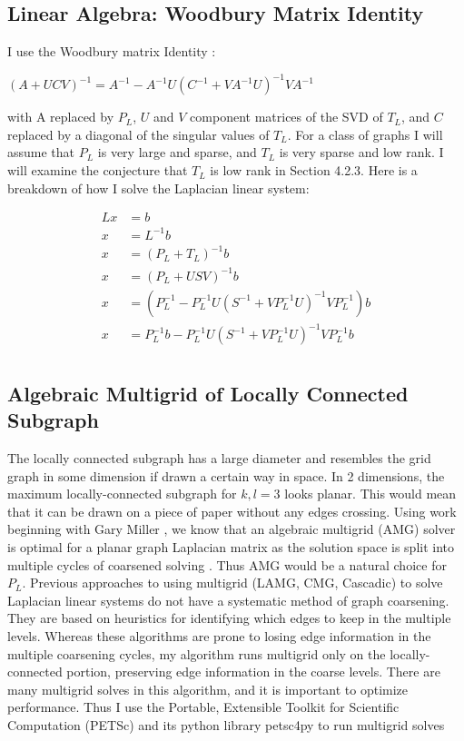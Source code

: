 \documentclass{article}
\begin{document}
\subsection{Linear Algebra: Woodbury Matrix Identity}
I use the Woodbury matrix Identity \cite{Woodbury:1950}:\\
\begin{spacing}{1}

\begin{center}
$(A+UCV)^{-1} = A^{-1} - A^{-1}U(C^{-1}+VA^{-1}U)^{-1}VA^{-1}$\\
\end{center}
\end{spacing}
with A replaced by $P_L$, $U$ and $V$ component matrices of the SVD of $T_L$, and $C$ replaced by a diagonal of the singular values of $T_L$. For a class of graphs I will assume that $P_L$ is very large and sparse, and $T_L$ is very sparse and low rank. I will examine the conjecture that $T_L$ is
low rank in Section 4.2.3. Here is a breakdown of how I solve the Laplacian linear system:

\begin{spacing}{1}
\begin{align*}
Lx & = b\\
x & = L^{-1}b\\
x & = (P_L+T_L)^{-1}b\\
x & = (P_L+USV)^{-1}b\\
x & = (P_L^{-1}-P_L^{-1}U(S^{-1}+VP_L^{-1}U)^{-1}VP_L^{-1})b\\
x & = P_L^{-1}b-P_L^{-1}U(S^{-1}+VP_L^{-1}U)^{-1}VP_L^{-1}b\\
\end{align*}
\end{spacing}


\subsection{Algebraic Multigrid of Locally Connected Subgraph}
The locally connected subgraph has a large diameter and resembles the grid graph in some dimension if drawn a certain way in space. In 2 dimensions, the maximum locally-connected subgraph for $k,l=3$ looks planar. This would mean that it can be drawn on a piece of paper without any edges crossing. Using work beginning with Gary Miller \cite{Miller:1995}, we know that an algebraic multigrid (AMG) solver is optimal for a planar graph Laplacian matrix as the solution space is split into multiple cycles of coarsened solving \cite{Brandt:1984}. Thus AMG would be a natural choice for $P_L$. Previous approaches to using multigrid (LAMG, CMG, Cascadic) to solve Laplacian linear systems do not have a systematic method of graph coarsening. They are based on heuristics for identifying which edges to keep in the multiple levels. Whereas these algorithms are prone to losing edge information in the multiple coarsening cycles, my algorithm runs multigrid only on the locally-connected portion, preserving edge information in the coarse levels. There are many multigrid solves in this algorithm, and it is important to optimize performance. Thus I use the Portable, Extensible Toolkit for Scientific Computation (PETSc) and its python library petsc4py to run multigrid solves \cite{petsc-user-ref, Dalcin:2011}
\end{document}
